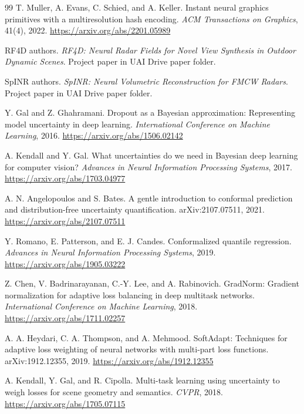 \documentclass[11pt]{article}
\begin{document}
\begin{thebibliography}{99}
T. Muller, A. Evans, C. Schied, and A. Keller.
\newblock Instant neural graphics primitives with a multiresolution hash encoding.
\newblock \emph{ACM Transactions on Graphics}, 41(4), 2022.
\newblock \url{https://arxiv.org/abs/2201.05989}

RF4D authors.
\newblock \emph{RF4D: Neural Radar Fields for Novel View Synthesis in Outdoor Dynamic Scenes}.
\newblock Project paper in UAI Drive paper folder.

SpINR authors.
\newblock \emph{SpINR: Neural Volumetric Reconstruction for FMCW Radars}.
\newblock Project paper in UAI Drive paper folder.

Y. Gal and Z. Ghahramani.
\newblock Dropout as a Bayesian approximation: Representing model uncertainty in deep learning.
\newblock \emph{International Conference on Machine Learning}, 2016.
\newblock \url{https://arxiv.org/abs/1506.02142}

A. Kendall and Y. Gal.
\newblock What uncertainties do we need in Bayesian deep learning for computer vision?
\newblock \emph{Advances in Neural Information Processing Systems}, 2017.
\newblock \url{https://arxiv.org/abs/1703.04977}

A. N. Angelopoulos and S. Bates.
\newblock A gentle introduction to conformal prediction and distribution-free uncertainty quantification.
\newblock arXiv:2107.07511, 2021.
\newblock \url{https://arxiv.org/abs/2107.07511}

Y. Romano, E. Patterson, and E. J. Candes.
\newblock Conformalized quantile regression.
\newblock \emph{Advances in Neural Information Processing Systems}, 2019.
\newblock \url{https://arxiv.org/abs/1905.03222}

Z. Chen, V. Badrinarayanan, C.-Y. Lee, and A. Rabinovich.
\newblock GradNorm: Gradient normalization for adaptive loss balancing in deep multitask networks.
\newblock \emph{International Conference on Machine Learning}, 2018.
\newblock \url{https://arxiv.org/abs/1711.02257}

A. A. Heydari, C. A. Thompson, and A. Mehmood.
\newblock SoftAdapt: Techniques for adaptive loss weighting of neural networks with multi-part loss functions.
\newblock arXiv:1912.12355, 2019.
\newblock \url{https://arxiv.org/abs/1912.12355}

A. Kendall, Y. Gal, and R. Cipolla.
\newblock Multi-task learning using uncertainty to weigh losses for scene geometry and semantics.
\newblock \emph{CVPR}, 2018.
\newblock \url{https://arxiv.org/abs/1705.07115}


\end{thebibliography}
\end{document}
